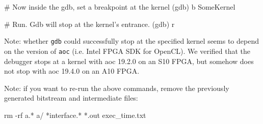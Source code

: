 \begin{enumerate}
\begin{markdown}
    # Now inside the gdb, set a breakpoint at the kernel
    (gdb) b SomeKernel
    
    # Run. Gdb will stop at the kernel's entrance.
    (gdb) r
    \end{markdown}
    
    Note: whether \texttt{gdb} could successfully stop at the specified kernel seems to depend on the version of \texttt{aoc} (i.e. Intel FPGA SDK for OpenCL). We verified that the debugger stops at a kernel with aoc 19.2.0 on an S10 FPGA, but somehow does not stop with aoc 19.4.0 on an A10 FPGA.
\end{enumerate}

Note: if you want to re-run the above commands, remove the previously generated bitstream and intermediate files:
    \begin{markdown}
        rm -rf a.* a/ *interface.* *.out exec_time.txt
    \end{markdown}